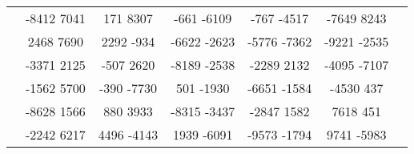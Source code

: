 \begin{landscape}
\begin{table}[]
\begin{tabular}{|c|ccccc|c|}
                & -8412 7041 & 171 8307 & -661 -6109 & -767 -4517 & -7649 8243 & 		 \\
                & 2468 7690 & 2292 -934 & -6622 -2623 & -5776 -7362 & -9221 -2535 & 		 \\
                & -3371 2125 & -507 2620 & -8189 -2538 & -2289 2132 & -4095 -7107 & 		 \\
                & -1562 5700 & -390 -7730 & 501 -1930 & -6651 -1584 & -4530 437 & 		 \\
                & -8628 1566 & 880 3933 & -8315 -3437 & -2847 1582 & 7618 451 & 		 \\
                & -2242 6217 & 4496 -4143 & 1939 -6091 & -9573 -1794 & 9741 -5983 & 		 \\ \hline
        \end{tabular}
    \end{table}
\end{landscape}
